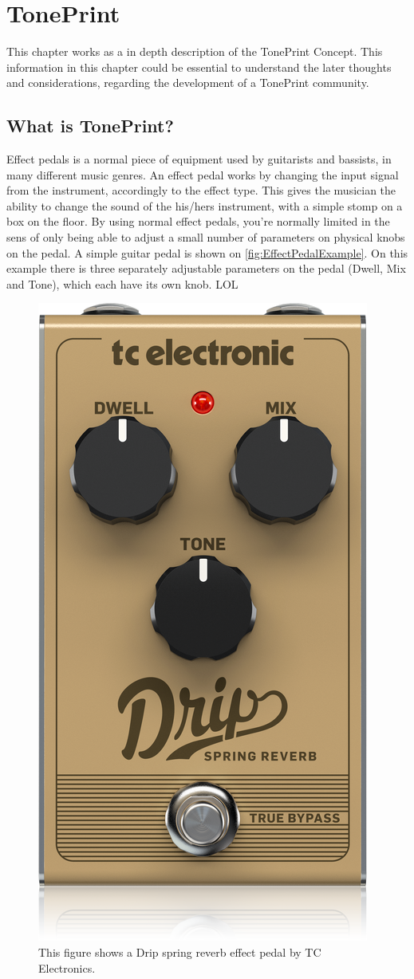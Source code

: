 \chapter{TonePrint}
\label{TonePrintConcept}

This chapter works as a in depth description of the TonePrint Concept. This information in this chapter could be essential to understand the later thoughts and considerations, regarding the development of a TonePrint community.

\section{What is TonePrint?}
\label{WhatIsTonePrint}

Effect pedals is a normal piece of equipment used by guitarists and bassists, in many different music genres. An effect pedal works by changing the input signal from the instrument, accordingly to the effect type. This gives the musician the ability to change the sound of the his/hers instrument, with a simple stomp on a box on the floor. By using normal effect pedals, you're normally limited in the sens of only being able to adjust a small number of parameters on physical knobs on the pedal. A simple guitar pedal is shown on \autoref{fig:EffectPedalExample}. On this example there is three separately adjustable parameters on the pedal (Dwell, Mix and Tone), which each have its own knob. LOL

\begin{figure}
	\centering
	\includegraphics[width=.25\textwidth]{Graphics/EffectPedalExample}
	 \caption{This figure shows a Drip spring reverb effect pedal by TC Electronics.}
    \label{fig:EffectPedalExample}
\end{figure}

